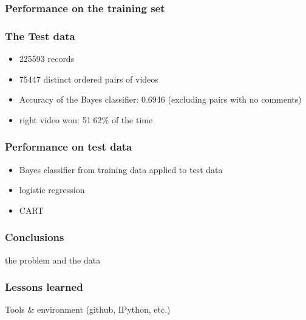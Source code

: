 \documentclass[fleqn]{beamer}
\begin{document}

\begin{frame}
\frametitle{Performance on the training set}

\end{frame}

\begin{frame}
\frametitle{The Test data}
    \begin{itemize}
        \item 225593 records
        \item 75447 distinct ordered pairs of videos
        \item Accuracy of the Bayes classifier: 0.6946 (excluding pairs with no comments)
        \item right video won: 51.62\% of the time
    \end{itemize}

\end{frame}

\begin{frame}
\frametitle{Performance on test data}
    \begin{itemize}
        \item Bayes classifier from training data applied to test data
        \item logistic regression
        \item CART
    \end{itemize}

\end{frame}

\begin{frame}
\frametitle{Conclusions}
    the problem and the data

\end{frame}

\begin{frame}
\frametitle{Lessons learned}
   Tools \& environment (github, IPython, etc.)


\end{frame}
\end{document}
